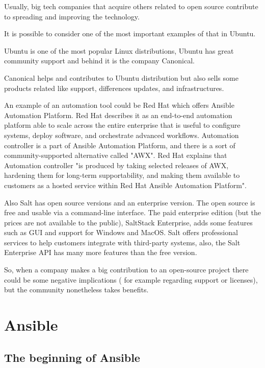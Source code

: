 \documentclass[12pt,a4paper,openright,twoside]{book}
\begin{document}
Usually, big tech companies that acquire others related to open source contribute to spreading and improving the technology.


It is possible to consider one of the most important examples of that in Ubuntu.


Ubuntu is one of the most popular Linux distributions, Ubuntu has great community support and behind it is the company Canonical.


Canonical helps and contributes to Ubuntu distribution but also sells some products related like support, differences updates, and infrastructures.

An example of an automation tool could be Red Hat which offers Ansible Automation Platform.
Red Hat describes it as an end-to-end automation platform able to scale across the entire enterprise that is useful to configure systems, deploy software, and orchestrate advanced workflows.\cite{ansibleAutomationPlatform}
Automation controller is a part of Ansible Automation Platform, and there is a sort of community-supported alternative called "AWX"\cite{ansibleAwxAAP}.
Red Hat explains that Automation controller "is produced by taking selected releases of AWX, hardening them for long-term supportability, and making them available to customers as a hosted service within Red Hat Ansible Automation Platform"\cite{ansibleFaq}.

Also Salt has open source versions and an enterprise version. The open source is free and usable via a command-line interface.
The paid enterprise edition (but the prices are not available to the public), SaltStack Enterprise, adds some features such as GUI and support for Windows and MacOS.
Salt offers professional services to help customers integrate with third-party systems, also, the Salt Enterprise API has many more features than the free version.\cite{saltTechTarget}


So, when a company makes a big contribution to an open-source project there could be some negative implications ( for example regarding support or licenses), but the community nonetheless takes benefits.

\chapter{Ansible}

\section{The beginning of Ansible}
\end{document}

